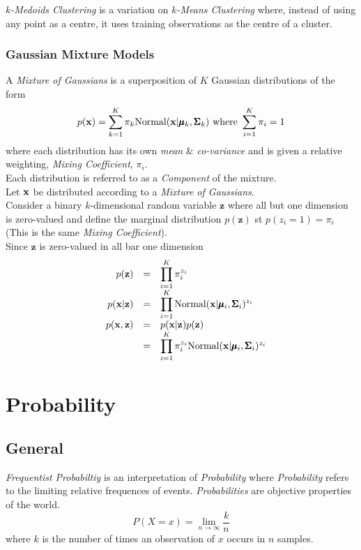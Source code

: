 \documentclass[11pt,a4paper]{article}
\begin{document}
\textit{$k$-Medoids Clustering} is a variation on \textit{$k$-Means Clustering} where, instead of using any point as a centre, it uses training  observations as the centre of a cluster.

\subsubsection{Gaussian Mixture Models}

A \textit{Mixture of Gaussians} is a superposition of $K$ Gaussian distributions of the form
$$p(\textbf{x})=\sum_{k=1}^K\pi_k\text{Normal}(\textbf{x}|\pmb\mu_k,\pmb\Sigma_k)\text{ where }\sum_{i=1}^K\pi_i=1$$
where each distribution has its own \textit{mean} \& \textit{co-variance} and is given a relative weighting, \textit{Mixing Coefficient}, $\pi_i$.\\
\nb Each distribution is referred to as a \textit{Component} of the mixture.\\

Let $\textbf{x}$ be distributed according to a \textit{Mixture of Gaussians}.\\
Consider a binary $k$-dimensional random variable $\textbf{z}$ where all but one dimension is zero-valued and define the  marginal distribution $p(\textbf{z})$ st $p(z_i=1)=\pi_i$ (\nb This is the same \textit{Mixing Coefficient}).\\
Since $\textbf{z}$ is zero-valued in all bar one dimension
\[\begin{array}{rrcl}
&p(\textbf{z})&=&\displaystyle\prod_{i=1}^K\pi_i^{z_i}\\
&p(\textbf{x}|\textbf{z})&=&\displaystyle\prod_{i=1}^K\text{Normal}(\textbf{x}|\pmb\mu_i,\pmb\Sigma_i)^{z_i}\\
&p(\textbf{x},\textbf{z})&=&p(\textbf{x}|\textbf{z})p(\textbf{z})\\
&&=&{\displaystyle\prod_{i=1}^K\pi_i^{z_i}}\text{Normal}(\textbf{x}|\pmb\mu_i,\pmb\Sigma_i)^{z_i}
\end{array}\]

\section{Probability}

\subsection{General}

\textit{Frequentist Probabiltiy} is an interpretation of \textit{Probability} where \textit{Probability} refers to the limiting relative frequences of events. \textit{Probabilities} are objective properties of the world.
$$P(X=x)=\lim_{n\to\infty}\dfrac{k}{n}$$
where $k$ is the number of times an observation of $x$ occurs in $n$ samples.\\
\end{document}
